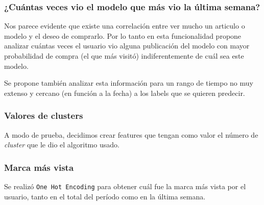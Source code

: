 \documentclass[a4paper]{article}
\begin{document}
\subsubsection{¿Cuántas veces vio el modelo que más vio la última semana?}

\begin{sloppypar}
	\texttt{}
\end{sloppypar}

Nos parece evidente que existe una correlación entre ver mucho un articulo o modelo y el deseo de comprarlo. Por lo tanto en esta funcionalidad propone analizar cuántas veces el usuario vio alguna publicación del modelo con mayor probabilidad de compra (el que más visitó) indiferentemente de cuál sea este modelo. 

Se propone también analizar esta información para un rango de tiempo no muy extenso y cercano (en función a la fecha) a los labels que se quieren predecir. 

\subsubsection{Valores de clusters}

\begin{sloppypar}
	\texttt{}
\end{sloppypar}

A modo de prueba, decidimos crear features que tengan como valor el número de \textit{cluster} que le dio el algoritmo usado.

\subsubsection{Marca más vista}

\begin{sloppypar}
	\texttt{}
\end{sloppypar}

Se realizó \texttt{One Hot Encoding} para obtener cuál fue la marca más vista por el usuario, tanto en el total del período como en la última semana.
\end{document}
